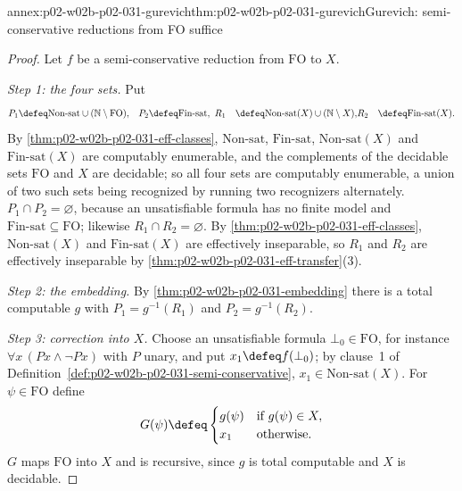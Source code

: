 \begin{annexitem}{annex:p02-w02b-p02-031-gurevich}{thm:p02-w02b-p02-031-gurevich}{Gurevich: semi-conservative reductions from FO suffice}
\begin{proof}
Let \(f\) be a semi-conservative reduction from \(\mathrm{FO}\) to \(X\).

\emph{Step 1: the four sets.}  Put
\[
\begin{aligned}
 P_1&\defeq\mathrm{Non\text{-}sat}\cup(\mathbb N\setminus\mathrm{FO}),&
 P_2&\defeq\mathrm{Fin\text{-}sat},\
 R_1&\defeq\mathrm{Non\text{-}sat}(X)\cup(\mathbb N\setminus X),&
 R_2&\defeq\mathrm{Fin\text{-}sat}(X).
\end{aligned}
\]
By \cref{thm:p02-w02b-p02-031-eff-classes}, \(\mathrm{Non\text{-}sat}\),
\(\mathrm{Fin\text{-}sat}\), \(\mathrm{Non\text{-}sat}(X)\) and
\(\mathrm{Fin\text{-}sat}(X)\) are computably enumerable, and the complements of
the decidable sets \(\mathrm{FO}\) and \(X\) are decidable; so all four sets are
computably enumerable, a union of two such sets being recognized by running two
recognizers alternately.  \(P_1\cap P_2=\varnothing\), because an unsatisfiable
formula has no finite model and \(\mathrm{Fin\text{-}sat}\subseteq\mathrm{FO}\);
likewise \(R_1\cap R_2=\varnothing\).  By
\cref{thm:p02-w02b-p02-031-eff-classes}, \(\mathrm{Non\text{-}sat}(X)\) and
\(\mathrm{Fin\text{-}sat}(X)\) are effectively inseparable, so \(R_1\) and
\(R_2\) are effectively inseparable by
\cref{thm:p02-w02b-p02-031-eff-transfer}(3).

\emph{Step 2: the embedding.}  By \cref{thm:p02-w02b-p02-031-embedding} there
is a total computable \(g\) with \(P_1=g^{-1}(R_1)\) and \(P_2=g^{-1}(R_2)\).

\emph{Step 3: correction into \(X\).}  Choose an unsatisfiable formula
\(\bot_0\in\mathrm{FO}\), for instance \(\forall x\,(Px\land\neg Px)\) with
\(P\) unary, and put \(x_1\defeq f(\bot_0)\); by clause~1 of
Definition~\ref{def:p02-w02b-p02-031-semi-conservative},
\(x_1\in\mathrm{Non\text{-}sat}(X)\).  For \(\psi\in\mathrm{FO}\) define
\[
 G(\psi)\defeq
 \begin{cases}
  g(\psi)&\text{if }g(\psi)\in X,\\
  x_1&\text{otherwise.}
 \end{cases}
\]
\(G\) maps \(\mathrm{FO}\) into \(X\) and is recursive, since \(g\) is total
computable and \(X\) is decidable.


\end{proof}
\end{annexitem}
